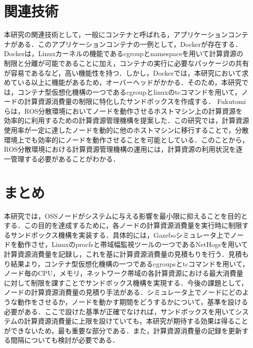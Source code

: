 \documentclass[11pt]{ujarticle} %
\begin{document}
\section{関連技術}
本研究の関連技術として，一般にコンテナと呼ばれる，アプリケーションコンテナがある．このアプリケーションコンテナの一例として，Docker\cite{Docker}が存在する．Dockerは，Linuxカーネルの機能であるcgroupとnamespaceを用いて計算資源の制限と分離が可能であることに加え，コンテナの実行に必要なパッケージの共有が容易であるなど，高い機能性を持つ．しかし，Dockerでは，本研究において求めている以上に機能があるため，オーバーヘッドがかかる．そのため，本研究では，コンテナ型仮想化機構の一つであるcgroupとlinuxのtcコマンドを用いて，ノードの計算資源消費量の制限に特化したサンドボックスを作成する．
Fukutomiらは，ROS分散環境においてノードを動作させるホストマシン上の計算資源を効率的に利用するための計算資源管理機構を提案した\cite{ResourceManeger}．この研究では，計算資源使用率が一定に達したノードを動的に他のホストマシンに移行することで，分散環境上でも効率的にノードを動作させることを可能としている．このことから，ROS分散環境における計算資源管理機構の運用には，計算資源の利用状況を逐一管理する必要があることがわかる．

\section{まとめ}
本研究では，OSSノードがシステムに与える影響を最小限に抑えることを目的とする．この目的を達成するために，各ノードの計算資源消費量を実行時に制限するサンドボックス機構を実装する．具体的には，Gazeboシミュレータ上でノードを動作させ，Linuxのprocfsと帯域幅監視ツールの一つであるNetHogsを用いて計算資源消費量を記録し，これを基に計算資源消費量の見積もりを行う．見積もり結果より，コンテナ型仮想化機構の一つであるcgroupsとtcコマンドを用いて，ノード毎のCPU，メモリ，ネットワーク帯域の各計算資源における最大消費量に対して制限を課すことでサンドボックス機構を実現する．今後の課題として，ノードの計算資源消費量の見積り手法がある．シミュレータ上でノードにどのような動作をさせるか，ノードを動かす期間をどうするかについて，基準を設ける必要がある．ここで設けた基準が正確でなければ，サンドボックスを用いてシステムの計算資源消費量に上限を設けていても，本研究が期待する効果は得ることができないため，最も重要な部分である．また，計算資源消費量の記録を更新する間隔についても検討が必要である．
\end{document}

